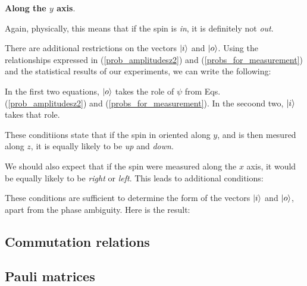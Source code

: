 \documentclass{article}
\begin{document}
\textbf{Along the $y$ axis}.



Again, physically, this means that if the spin is \textit{in}, it is definitely not \textit{out}.

There are additional restrictions on the vectors $\ket{i}$ and $\ket{o}$. Using the relationships expressed in (\ref{prob_amplitudesz2}) and (\ref{probs_for_measurement}) and the statistical results of our experiments, we can write the following:



In the first two equations, $\ket{o}$ takes the role of $\psi$ from Eqs. (\ref{prob_amplitudesz2}) and (\ref{probs_for_measurement}). In the secoond two, $\ket{i}$ takes that role.


These conditiions state that if the spin in oriented along $y$, and is then mesured along $z$, it is equally likely to be \textit{up} and \textit{down}.

We should also expect that if the spin were measured along the $x$ axis, it would be equally likely to be \textit{right} or \textit{left}. This leads to additional conditions:



These conditions are sufficient to determine the form of the vectors $\ket{i}$ and $\ket{o}$, apart from the phase ambiguity. Here is the result:




\subsection{Commutation relations}

\subsection{Pauli matrices}
\end{document}
